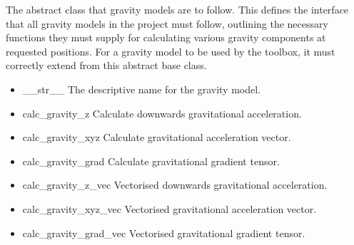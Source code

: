 \documentclass[letterpaper,10pt,english]{sphinxmanual}
\begin{document}
\begin{fulllineitems}
\label{\detokenize{modules/gravity/base:qnav.gravity.base.GravityModel}}
\pysigstartsignatures
{}
\pysigstopsignatures
\sphinxAtStartPar
The abstract class that gravity models are to follow.
This defines the interface that all gravity models in the project must
follow, outlining the necessary functions they must supply for
calculating various gravity components at requested positions. For a
gravity model to be used by the toolbox, it must correctly extend from
this abstract base class.
\begin{description}
\begin{itemize}
\item {} 
\sphinxAtStartPar
\_\_str\_\_ \sphinxhyphen{} The descriptive name for the gravity model.

\item {} 
\sphinxAtStartPar
calc\_gravity\_z \sphinxhyphen{} Calculate downwards gravitational acceleration.

\item {} 
\sphinxAtStartPar
calc\_gravity\_xyz \sphinxhyphen{} Calculate gravitational acceleration vector.

\item {} 
\sphinxAtStartPar
calc\_gravity\_grad \sphinxhyphen{} Calculate gravitational gradient tensor.

\end{itemize}

\begin{itemize}
\item {} 
\sphinxAtStartPar
calc\_gravity\_z\_vec \sphinxhyphen{} Vectorised downwards gravitational acceleration.

\item {} 
\sphinxAtStartPar
calc\_gravity\_xyz\_vec \sphinxhyphen{} Vectorised gravitational acceleration vector.

\item {} 
\sphinxAtStartPar
calc\_gravity\_grad\_vec \sphinxhyphen{} Vectorised gravitational gradient tensor.

\end{itemize}

\end{description}


\end{fulllineitems}
\end{document}
